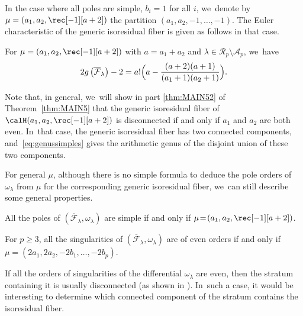 In the case where all poles are simple, \ie $b_i = 1$ for all $i$, we~denote by $\mu = (a_1, a_2, \rec[-1][a+2])$ the partition $(a_{1},a_{2},-1,\dots,-1)$. The Euler characteristic of the generic isoresidual fiber is given as follows in that case.

\begin{thm}\label{thm:simple}
For $\mu = (a_1, a_2, \rec[-1][a+2])$ with $a=a_{1}+a_{2}$ and $\lambda\in \mathcal{R}_{p} \setminus \mathcal{A}_{p}$, we~have
\begin{equation}\label{eq:genussimples}
2g\left(\overline{\mathcal{F}}_{\lambda}\right)-2 =
a! \Bigl(a - \frac{(a+2)(a+1)}{(a_1+1)(a_2+1)} \Bigr).
\end{equation}
\end{thm}

Note that, in general, we~will show in part \eqref{thm:MAIN52} of Theorem~\ref{thm:MAIN5} that the generic isoresidual fiber of $\calH(a_1, a_2, \rec[-1][a+2])$ is disconnected if and only if $a_1$ and $a_2$ are both even. In~that case, the generic isoresidual fiber has two connected components, and~\eqref{eq:genussimples} gives the arithmetic genus of the disjoint union of these two components.

For general $\mu$, although there is no simple formula to deduce the pole orders of~$\omega_\lambda$ from $\mu$ for the corresponding generic isoresidual fiber, we~can still describe some general properties.

\begin{thm}\label{thm:MAIN3}
All the poles of $(\overline{\mathcal{F}}_{\lambda},\omega_{\lambda})$ are simple if and only if $\mu\!=\!(a_1, a_2, \rec[-1][a+2])$.

For $p \geq 3$, all the singularities of $(\overline{\mathcal{F}}_{\lambda},\omega_{\lambda})$ are of even orders if and only if $\mu=(2a_{1},2a_{2},-2b_{1},\dots,-2b_{p})$.
\end{thm}

If all the orders of singularities of the differential $\omega_{\lambda}$ are even, then the stratum containing it is usually disconnected (as shown in \cite{Bo}). In~such a case, it would be interesting to determine which connected component of the stratum contains the isoresidual fiber.

